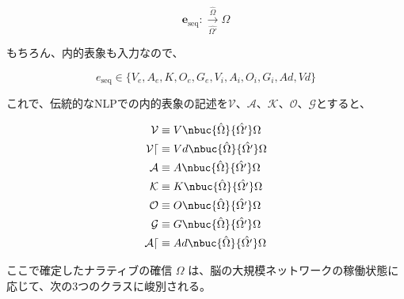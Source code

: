 \begin{equation}
    \boldsymbol{e}_{\mathrm{seq}} :\xrightarrow[\hat{\Omega'}]{\hat{\Omega}} \Omega
    \label{eq:macro_omega}
\end{equation}

もちろん、内的表象も入力なので、

\begin{equation}
    e_{\mathrm{seq}} \in \{V_e,A_e,K,O_e,G_e,V_i,A_i,O_i,G_i,Ad,Vd\}
\end{equation}

これで、伝統的なNLPでの内的表象の記述を$\mathcal{V}$、$\mathcal{A}$、$\mathcal{K}$、$\mathcal{O}$、$\mathcal{G}$とすると、

\begin{align}
    \mathcal{V} &\equiv V \nbuc{\hat{\Omega}}{\hat{\Omega'}} \Omega \\
    \mathcal{Vd} &\equiv Vd \nbuc{\hat{\Omega}}{\hat{\Omega'}} \Omega \\
    \mathcal{A} &\equiv A \nbuc{\hat{\Omega}}{\hat{\Omega'}} \Omega \\
    \mathcal{K} &\equiv K \nbuc{\hat{\Omega}}{\hat{\Omega'}} \Omega \\
    \mathcal{O} &\equiv O \nbuc{\hat{\Omega}}{\hat{\Omega'}} \Omega \\
    \mathcal{G} &\equiv G \nbuc{\hat{\Omega}}{\hat{\Omega'}} \Omega \\
    \mathcal{Ad} &\equiv Ad \nbuc{\hat{\Omega}}{\hat{\Omega'}} \Omega \\
\end{align}



ここで確定したナラティブの確信 $\Omega$ は、脳の大規模ネットワークの稼働状態に応じて、次の3つのクラスに峻別される。

